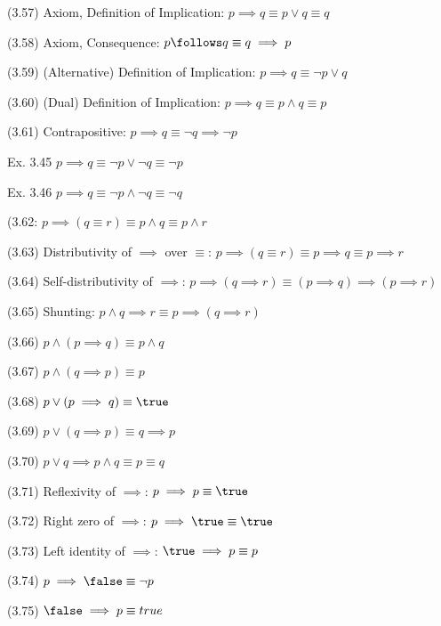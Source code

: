\documentclass[a4paper,10pt]{article}
\newenvironment{theoremlist}{
\begin{description}
  \setlength{\itemsep}{1.5pt}
  \setlength{\parskip}{0pt}
  \setlength{\parsep}{0pt}
}{\end{description}}
\begin{document}
\begin{theoremlist}
\item[(3.57) Axiom, Definition of Implication:]					$ p \implies q \equiv p \lor q \equiv q $
\item[(3.58) Axiom, Consequence:]						$ p \follows q \equiv q \implies p $
\item[(3.59) (Alternative) Definition of Implication:]				$ p\implies q \equiv \lnot p \lor q $
\item[(3.60) (Dual) Definition of Implication:]					$ p \implies q \equiv p \land q \equiv p $
\item[(3.61) Contrapositive:]							$ p \implies q \equiv \lnot q \implies \lnot p $

\item[Ex. 3.45]									$ p \implies q \equiv \lnot p \lor \lnot q \equiv \lnot p $
\item[Ex. 3.46]									$ p \implies q \equiv \lnot p \land \lnot q \equiv \lnot q $
\item[(3.62:]									$ p \implies (q \equiv r) \equiv p \land q \equiv p \land r $
\item[(3.63) Distributivity of $\implies$ over $\equiv$:]			$ p \implies (q \equiv r) \equiv p \implies q \equiv p \implies r $
\item[(3.64) Self-distributivity of $\implies$:]				$ p \implies (q \implies r) \equiv (p \implies q) \implies (p \implies r)$
\item[(3.65) Shunting:]								$ p \land q \implies r \equiv p \implies (q \implies r) $
\item[(3.66)]									$ p \land (p \implies q) \equiv p \land q $
\item[(3.67)]									$ p \land (q \implies p) \equiv p $
\item[(3.68)]									$ p \lor (p \implies q) \equiv \true $
\item[(3.69)]									$ p \lor (q \implies p) \equiv q \implies p $
\item[(3.70)]									$ p \lor q \implies p \land q \equiv p \equiv q$
\item[(3.71) Reflexivity of $\implies$:]					$ p \implies p \equiv \true $
\item[(3.72) Right zero of $\implies$:]						$ p \implies \true \equiv \true $
\item[(3.73) Left identity of $\implies$:]					$ \true \implies p \equiv p $
\item[(3.74)]									$ p \implies \false \equiv \lnot p $
\item[(3.75)]									$ \false \implies p \equiv true $

\end{theoremlist}
\end{document}
